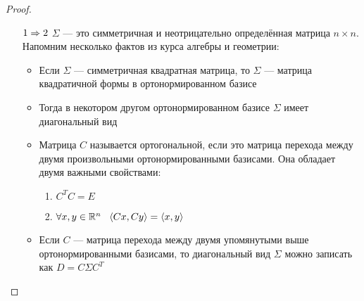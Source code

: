 \begin{proof}~
    \begin{itemize}
        \item[$1 \Rightarrow 2$] $\Sigma$ --- это симметричная и неотрицательно определённая матрица $n \times n$. Напомним несколько фактов из курса алгебры и геометрии:
        \begin{itemize}
            \item Если $\Sigma$ --- симметричная квадратная матрица, то $\Sigma$ --- матрица квадратичной формы в ортонормированном базисе
            
            \item Тогда в некотором другом ортонормированном базисе $\Sigma$ имеет диагональный вид
            
            \item Матрица $C$ называется ортогональной, если это матрица перехода между двумя произвольными ортонормированными базисами. Она обладает двумя важными свойствами:
            \begin{enumerate}
            	\item $C^T C = E$
            	
            	\item $\forall x, y \in \mathbb{R}^n\ \ \left\langle Cx, Cy\right\rangle = \left\langle x, y\right\rangle$
            \end{enumerate}
        
            \item Если $C$ --- матрица перехода между двумя упомянутыми выше ортонормированными базисами, то диагональный вид $\Sigma$ можно записать как $D = C \Sigma C^T$
            

\end{itemize}
\end{itemize}
\end{proof}
